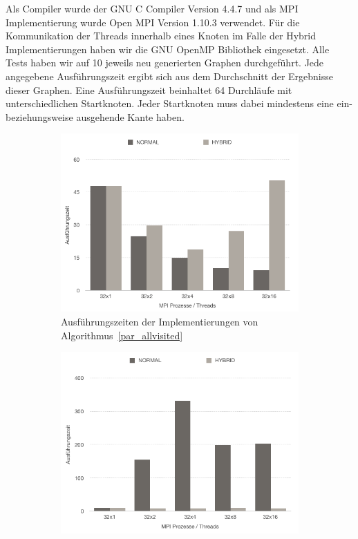 \documentclass[11pt,a4paper]{article}
\begin{document}
Als Compiler wurde der GNU C Compiler Version 4.4.7 und als MPI Implementierung wurde Open MPI Version 1.10.3 verwendet. Für die Kommunikation der Threads innerhalb eines Knoten im Falle der Hybrid Implementierungen haben wir die GNU OpenMP Bibliothek eingesetzt. Alle Tests haben wir auf 10 jeweils neu generierten Graphen durchgeführt. Jede angegebene Ausführungszeit ergibt sich aus dem Durchschnitt der Ergebnisse dieser Graphen. Eine Ausführungszeit beinhaltet 64 Durchläufe mit unterschiedlichen Startknoten. Jeder Startknoten muss dabei mindestens eine ein- beziehungsweise ausgehende Kante haben.\\
\begin{figure}[h]
    \begin{subfigure}[b]{0.5\textwidth}
        \includegraphics[width=1\textwidth]{times_algo1}
        \caption{Ausführungszeiten der Implementierungen von Algorithmus~\ref{par_allvisited}}
        \label{fig:times1}
    \end{subfigure}
   \hspace{0em}
    \begin{subfigure}[b]{0.5\textwidth}
        \includegraphics[width=1\textwidth]{reducing_parent}

\end{subfigure}
\end{figure}
\end{document}
